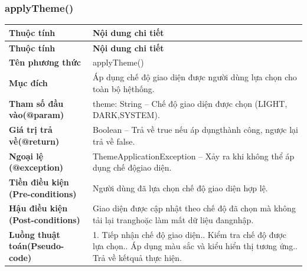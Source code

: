 \subsubsection{applyTheme()}
\begin{longtable}{|L{0.24\textwidth}|L{0.70\textwidth}|}
\hline
\textbf{Thuộc tính} & \textbf{Nội dung chi tiết} \\
\hline
\endfirsthead
\hline
\textbf{Thuộc tính} & \textbf{Nội dung chi tiết} \\
\hline
\endhead
\textbf{Tên phương thức} & applyTheme() \\
\hline
\textbf{Mục đích} & Áp dụng chế độ giao diện được người dùng lựa chọn cho toàn bộ hệ\newline thống. \\
\hline
\textbf{Tham số đầu vào}\newline \textbf{(@param)} & theme: String – Chế độ giao diện được chọn (LIGHT, DARK,\newline SYSTEM). \\
\hline
\textbf{Giá trị trả về(@return)} & Boolean – Trả về true nếu áp dụngthành công, ngược lại trả về false. \\
\hline
\textbf{Ngoại lệ (@exception)} & ThemeApplicationException – Xảy ra khi không thể áp dụng chế độ\newline giao diện. \\
\hline
\textbf{Tiền điều kiện (Pre-}\newline \textbf{conditions)} & Người dùng đã lựa chọn chế độ giao diện hợp lệ. \\
\hline
\textbf{Hậu điều kiện (Post-}\newline \textbf{conditions)} & Giao diện được cập nhật theo chế độ đã chọn mà không tải lại trang\newline hoặc làm mất dữ liệu đangnhập. \\
\hline
\textbf{Luồng thuật toán}\newline \textbf{(Pseudo-code)} & 1. Tiếp nhận chế độ giao diện.. Kiểm tra chế độ được lựa chọn.. Áp dụng màu sắc và kiểu hiển thị tương ứng.. Trả về kếtquả thực hiện. \\
\hline
\end{longtable}
\vspace{-0.5\baselineskip}
